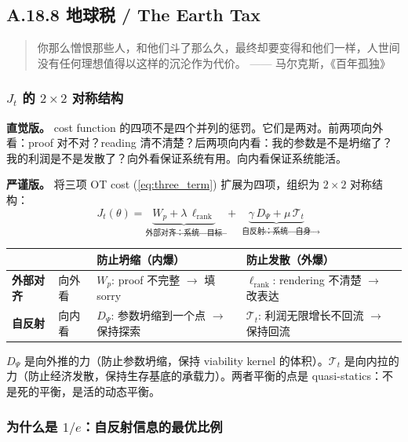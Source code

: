 \documentclass[11pt,a4paper]{article}
\theoremstyle{definition}
\theoremstyle{remark}
\begin{document}
\subsection{A.18.8 地球税 / The Earth Tax}

\begin{quote}
你那么憎恨那些人，和他们斗了那么久，最终却要变得和他们一样，人世间没有任何理想值得以这样的沉沦作为代价。 —— 马尔克斯，《百年孤独》
\end{quote}


\subsubsection*{$J_t$ 的 $2 \times 2$ 对称结构}

\textbf{直觉版。}
cost function 的四项不是四个并列的惩罚。它们是两对。前两项向外看：proof 对不对？reading 清不清楚？后两项向内看：我的参数是不是坍缩了？我的利润是不是发散了？向外看保证系统有用。向内看保证系统能活。

\textbf{严谨版。}
将三项 OT cost (\ref{eq:three_term}) 扩展为四项，组织为 $2 \times 2$ 对称结构：
\begin{equation}\label{eq:four_term}
  J_t(\theta) = \underbrace{W_p + \lambda\,\ell_{\mathrm{rank}}}_{\text{外部对齐：系统} \leftrightarrow \text{目标}} \;+\; \underbrace{\gamma\,D_\Psi + \mu\,\mathcal{T}_t}_{\text{自反射：系统} \leftrightarrow \text{自身}}
\end{equation}

\begin{center}
\small
\begin{tabularx}{\textwidth}{l l X X}
\toprule
& & \textbf{防止坍缩（内爆）} & \textbf{防止发散（外爆）} \\
\midrule
\textbf{外部对齐} & 向外看 & $W_p$: proof 不完整 $\to$ 填 sorry & $\ell_{\mathrm{rank}}$: rendering 不清楚 $\to$ 改表达 \\
\textbf{自反射} & 向内看 & $D_\Psi$: 参数坍缩到一个点 $\to$ 保持探索 & $\mathcal{T}_t$: 利润无限增长不回流 $\to$ 保持回流 \\
\bottomrule
\end{tabularx}
\end{center}

$D_\Psi$ 是向外推的力（防止参数坍缩，保持 viability kernel 的体积）。$\mathcal{T}_t$ 是向内拉的力（防止经济发散，保持生存基底的承载力）。两者平衡的点是 quasi-statics：不是死的平衡，是活的动态平衡。


\subsubsection*{为什么是 $1/e$：自反射信息的最优比例}
\end{document}
